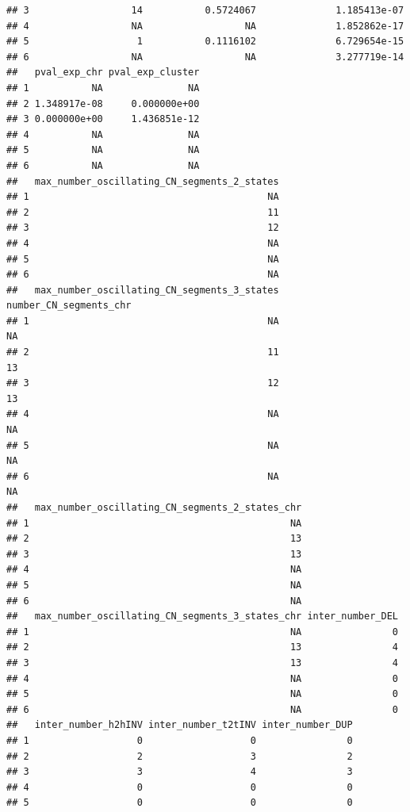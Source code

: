 \documentclass[twoside,a4wide,11pt]{article}\usepackage[]{graphicx}\usepackage[]{color}
\makeatletter
\newenvironment{kframe}{%
 \def\at@end@of@kframe{}%
 \ifinner\ifhmode%
  \def\at@end@of@kframe{\end{minipage}}%
  \begin{minipage}{\columnwidth}%
 \fi\fi%
 \def\FrameCommand##1{\hskip\@totalleftmargin \hskip-\fboxsep
 \colorbox{shadecolor}{##1}\hskip-\fboxsep
     \hskip-\linewidth \hskip-\@totalleftmargin \hskip\columnwidth}%
 \MakeFramed {\advance\hsize-\width
   \@totalleftmargin\z@ \linewidth\hsize
   \@setminipage}}%
 {\par\unskip\endMakeFramed%
 \at@end@of@kframe}
\newenvironment{knitrout}{}{} %
\makeatother
\begin{document}
\begin{knitrout}
\begin{kframe}
\begin{verbatim}
## 3                  14           0.5724067              1.185413e-07
## 4                  NA                  NA              1.852862e-17
## 5                   1           0.1116102              6.729654e-15
## 6                  NA                  NA              3.277719e-14
##   pval_exp_chr pval_exp_cluster
## 1           NA               NA
## 2 1.348917e-08     0.000000e+00
## 3 0.000000e+00     1.436851e-12
## 4           NA               NA
## 5           NA               NA
## 6           NA               NA
##   max_number_oscillating_CN_segments_2_states
## 1                                          NA
## 2                                          11
## 3                                          12
## 4                                          NA
## 5                                          NA
## 6                                          NA
##   max_number_oscillating_CN_segments_3_states number_CN_segments_chr
## 1                                          NA                     NA
## 2                                          11                     13
## 3                                          12                     13
## 4                                          NA                     NA
## 5                                          NA                     NA
## 6                                          NA                     NA
##   max_number_oscillating_CN_segments_2_states_chr
## 1                                              NA
## 2                                              13
## 3                                              13
## 4                                              NA
## 5                                              NA
## 6                                              NA
##   max_number_oscillating_CN_segments_3_states_chr inter_number_DEL
## 1                                              NA                0
## 2                                              13                4
## 3                                              13                4
## 4                                              NA                0
## 5                                              NA                0
## 6                                              NA                0
##   inter_number_h2hINV inter_number_t2tINV inter_number_DUP
## 1                   0                   0                0
## 2                   2                   3                2
## 3                   3                   4                3
## 4                   0                   0                0
## 5                   0                   0                0

\end{verbatim}
\end{kframe}
\end{knitrout}
\end{document}
